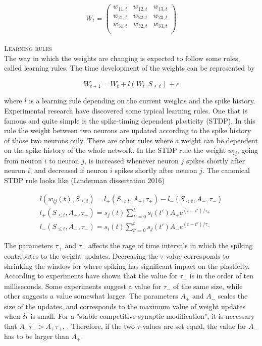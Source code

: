 \begin{equation*}
W_t = 
\begin{pmatrix}
w_{11,t} & w_{12,t} & w_{13,t}\\
w_{21,t} & w_{22,t} & w_{23,t}\\
w_{31,t} & w_{32,t} & w_{33,t}\\
\end{pmatrix} 
\end{equation*}
\\

\textsc{Learning rules}\\
The way in which the weights are changing is expected to follow some rules, called learning rules. The time development of the weights can be represented by

\begin{equation}
    W_{t+1} = W_t + l(W_t, S_{\leq t}) + \epsilon
\end{equation}

where $l$ is a learning rule depending on the current weights and the spike history. Experimental research have discovered some typical learning rules. One that is famous and quite simple is the spike-timing dependent plasticity (STDP). %
In this rule the weight between two neurons are updated according to the spike history of those two neurons only. There are other rules where a weight can be dependent on the spike history of the whole network. In the STDP rule the weight $w_{ij}$, going from neuron $i$ to neuron $j$, is increased whenever neuron $j$ spikes shortly after neuron $i$, and decreased if neuron $i$ spikes shortly after neuron $j$. The canonical STDP rule looks like (Linderman dissertation 2016)

\begin{equation}
    \begin{split}
    l(w_{ij}(t), S_{\leq t}) = l_+(S_{<t}, A_+,\tau_+) - l_-(S_{<t}, A_-,\tau_-)\\ 
    l_+(S_{\leq t}, A_+,\tau_+) = s_j(t) \sum_{t'=0}^{t} s_i(t') A_+ e^{(t-t')/\tau_+}\\ 
    l_-(S_{\leq t}, A_-,\tau_-) = s_i(t) \sum_{t'=0}^{t} s_j(t') A_- e^{(t-t')/\tau_-}
    \end{split}
\end{equation}

The parameters $\tau_+$ and $\tau_-$ affects the rage of time intervals in which the spiking contributes to the weight updates. Decreasing the $\tau$ value corresponds to shrinking the window for where spiking has significant impact on the plasticity. According to \cite{Song} experiments have shown that the value for $\tau_+$ is in the order of ten milliseconds. Some experiments suggest a value for $\tau_-$ of the same size, while other suggests a value somewhat larger. The parameters $A_+$ and $A_-$ scales the size of the updates, and corresponds to the maximum value of weight updates when $\delta t$ is small. For a "stable competitive synaptic modification", it is necessary that $A_-\tau_- > A_+\tau_+$, \cite{Song}. Therefore, if the two $\tau$-values are set equal, the value for $A_-$ has to be larger than $A_+$.

